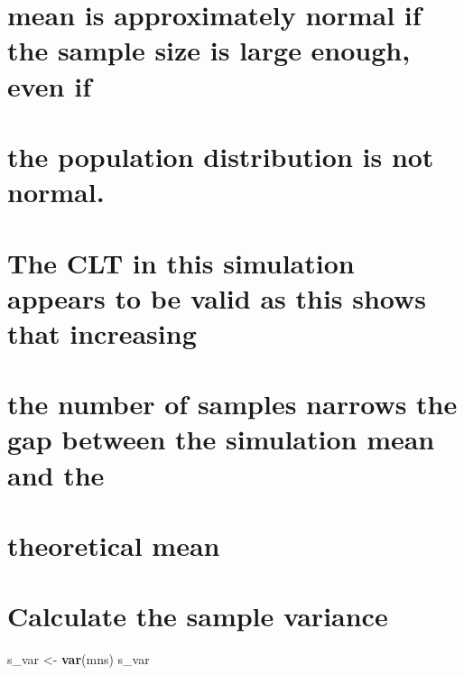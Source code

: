 \documentclass[
]{article}
\newenvironment{Shaded}{\begin{snugshade}}{\end{snugshade}}
\newcommand{\KeywordTok}[1]{\textcolor[rgb]{0.13,0.29,0.53}{\textbf{#1}}}
\newcommand{\NormalTok}[1]{#1}
\newcommand{\StringTok}[1]{\textcolor[rgb]{0.31,0.60,0.02}{#1}}
\begin{document}
\hypertarget{mean-is-approximately-normal-if-the-sample-size-is-large-enough-even-if}{%
\section{mean is approximately normal if the sample size is large
enough, even
if}\label{mean-is-approximately-normal-if-the-sample-size-is-large-enough-even-if}}

\hypertarget{the-population-distribution-is-not-normal.}{%
\section{the population distribution is not
normal.}\label{the-population-distribution-is-not-normal.}}

\hypertarget{the-clt-in-this-simulation-appears-to-be-valid-as-this-shows-that-increasing}{%
\section{The CLT in this simulation appears to be valid as this shows
that
increasing}\label{the-clt-in-this-simulation-appears-to-be-valid-as-this-shows-that-increasing}}

\hypertarget{the-number-of-samples-narrows-the-gap-between-the-simulation-mean-and-the}{%
\section{the number of samples narrows the gap between the simulation
mean and
the}\label{the-number-of-samples-narrows-the-gap-between-the-simulation-mean-and-the}}

\hypertarget{theoretical-mean}{%
\section{theoretical mean}\label{theoretical-mean}}

\hypertarget{calculate-the-sample-variance}{%
\section{Calculate the sample
variance}\label{calculate-the-sample-variance}}

\begin{Shaded}
\begin{Highlighting}[]
\NormalTok{s_var <-}\StringTok{ }\KeywordTok{var}\NormalTok{(mns)}
\NormalTok{s_var}
\end{Highlighting}
\end{Shaded}
\end{document}
